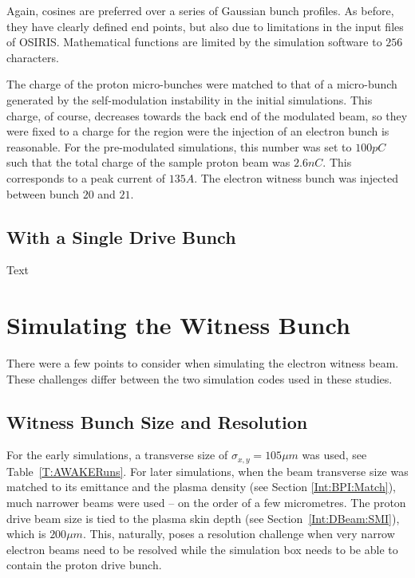 Again, cosines are preferred over a series of Gaussian bunch profiles.
As before, they have clearly defined end points, but also due to limitations in the input files of OSIRIS.
Mathematical functions are limited by the simulation software to $256$ characters.


The charge of the proton micro-bunches were matched to that of a micro-bunch generated by the self-modulation instability in the initial simulations.
This charge, of course, decreases towards the back end of the modulated beam, so they were fixed to a charge for the region were the injection of an electron bunch is reasonable.
For the pre-modulated simulations, this number was set to $100\unit{pC}$ such that the total charge of the sample proton beam was $2.6\unit{nC}$.
This corresponds to a peak current of $135\unit{A}$.
The electron witness bunch was injected between bunch $20$ and $21$.



\subsection{With a Single Drive Bunch}
\label{Sim:PBSingle}

Text

\section{Simulating the Witness Bunch}
\label{Sim:EBeam}

There were a few points to consider when simulating the electron witness beam.
These challenges differ between the two simulation codes used in these studies.

\subsection{Witness Bunch Size and Resolution}
\label{Sim:EBeam:SizeRes}

For the early simulations, a transverse size of $\sigma_{x,y}=105\unit{\mu m}$ was used, see Table~\ref{T:AWAKERuns}.
For later simulations, when the beam transverse size was matched to its emittance and the plasma density (see Section \ref{Int:BPI:Match}), much narrower beams were used -- on the order of a few micrometres.
The proton drive beam size is tied to the plasma skin depth (see Section~\ref{Int:DBeam:SMI}), which is $200\unit{\mu m}$.
This, naturally, poses a resolution challenge when very narrow electron beams need to be resolved while the simulation box needs to be able to contain the proton drive bunch.

